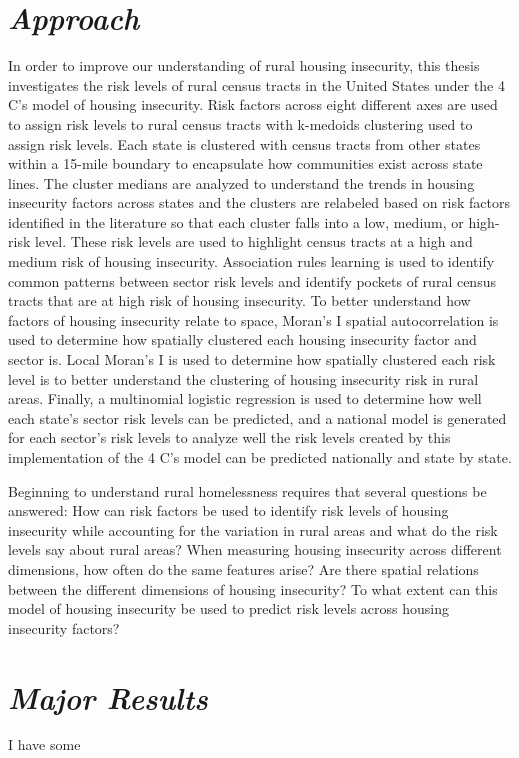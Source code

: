 \section{\textit{Approach}}
In order to improve our understanding of rural housing insecurity, this thesis investigates the risk levels of rural census tracts in the United States under the 4 C's model of housing insecurity. Risk factors across eight different axes are used to assign risk levels to rural census tracts with k-medoids clustering used to assign risk levels. Each state is clustered with census tracts from other states within a 15-mile boundary to encapsulate how communities exist across state lines. The cluster medians are analyzed to understand the trends in housing insecurity factors across states and the clusters are relabeled based on risk factors identified in the literature so that each cluster falls into a low, medium, or high-risk level. These risk levels are used to highlight census tracts at a high and medium risk of housing insecurity. Association rules learning is used to identify common patterns between sector risk levels and identify pockets of rural census tracts that are at high risk of housing insecurity. To better understand how factors of housing insecurity relate to space, Moran's I spatial autocorrelation is used to determine how spatially clustered each housing insecurity factor and sector is. Local Moran's I is used to determine how spatially clustered each risk level is to better understand the clustering of housing insecurity risk in rural areas. Finally, a multinomial logistic regression is used to determine how well each state's sector risk levels can be predicted, and a national model is generated for each sector's risk levels to analyze well the risk levels created by this implementation of the 4 C's model can be predicted nationally and state by state. 

Beginning to understand rural homelessness requires that several questions be answered: How can risk factors be used to identify risk levels of housing insecurity while accounting for the variation in rural areas and what do the risk levels say about rural areas? When measuring housing insecurity across different dimensions, how often do the same features arise? Are there spatial relations between the different dimensions of housing insecurity? To what extent can this model of housing insecurity be used to predict risk levels across housing insecurity factors?

\section{\textit{Major Results}}
I have some

